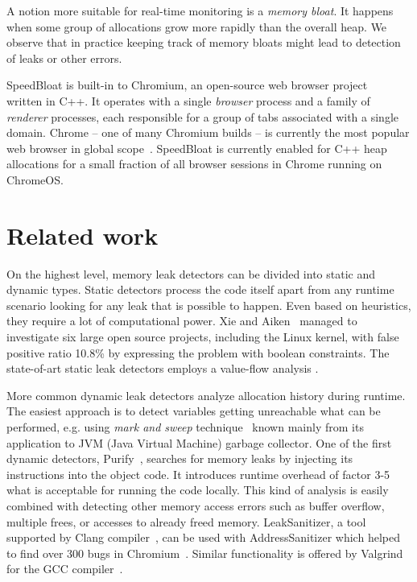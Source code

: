 \documentclass[preprint, numbers]{sigplanconf}
\begin{document}
A notion more suitable for real-time monitoring is a \textit{memory bloat}.
It happens when some group of allocations grow more rapidly than the overall heap.
We observe that in practice keeping track of memory bloats might lead to detection
of leaks or other errors.

SpeedBloat is built-in to Chromium, an open-source web browser
project~\cite{chromium} written in C++.
It operates with a single \textit{browser} process and a family
of \textit{renderer} processes, each responsible for a group
of tabs associated with a single domain.
Chrome -- one of many Chromium builds -- is currently the most popular web browser in global scope~\cite{wikimedia}.  SpeedBloat is currently enabled for C++ heap allocations for a small fraction of all browser sessions in Chrome running on ChromeOS. 

\section{Related work}

On the highest level, memory leak detectors can be divided into static
and dynamic types.
Static detectors process the code itself apart from any runtime scenario
looking for any leak that is possible to happen.
Even based on heuristics, they require a lot of computational power.
Xie and Aiken~\cite{boolean} managed to investigate six large open source
projects, including the Linux kernel, with false positive ratio 10.8\%
by expressing the problem with boolean constraints.
The state-of-art static leak detectors employs a value-flow
analysis \cite{flow, saber}.

More common dynamic leak detectors analyze allocation history during runtime.
The easiest approach is to detect variables getting unreachable
what can be performed, e.g. using \textit{mark and sweep} technique~\cite{mark-and-sweep}
known mainly from its application to JVM (Java Virtual Machine) garbage collector.
One of the first dynamic detectors, Purify~\cite{purify}, searches for memory leaks by injecting its instructions
into the object code.
It introduces runtime overhead of factor 3-5 what is acceptable for running
the code locally.
This kind of analysis is easily combined with detecting other memory access errors
such as buffer overflow, multiple frees, or accesses to already freed memory.
LeakSanitizer, a tool supported by Clang compiler~\cite{leak-san}, can be used with AddressSanitizer
which helped to find over 300 bugs in Chromium~\cite{address}.
Similar functionality is offered by Valgrind for the GCC compiler~\cite{valgrind}.
\end{document}
